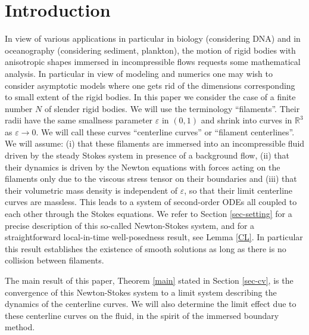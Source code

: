 \documentclass[JEP,XML,SOM,Unicode, NoEqCountersInSection,NoFloatCountersInSection,published]{cedram}
\newcommand{\R}{\mathbb{R}}
\let\eps\varepsilon
\theoremstyle{definition}
\theoremstyle{remark}
\begin{document}
\vspace*{-\baselineskip}\vskip0pt
\section{Introduction}
\label{sec-intro}

In view of various applications in particular in biology (considering DNA) and in oceanography (considering sediment, plankton), the motion of rigid bodies with aniso\-tropic shapes immersed in incompressible flows requests some mathematical analysis.
In particular in view of modeling and numerics one may wish to consider asymptotic models where one gets rid of the dimensions corresponding to small extent of the rigid bodies. In this paper we consider the case of a finite number $N$ of slender rigid bodies. We will use the terminology ``filaments''. Their radii have the same smallness parameter $\eps$ in $(0,1)$ and shrink into curves in $\R^3$ as $\eps \to 0$. We will call these curves ``centerline curves'' or ``filament centerlines''. We will assume: (i) that these filaments are immersed into an incompressible fluid driven by the steady Stokes system in presence of a background flow, (ii) that their dynamics is driven by the Newton equations with forces acting on the filaments only due to the viscous stress tensor on their boundaries and (iii) that their volumetric mass density is independent of $\eps$, so that their limit centerline curves are massless.
This leads to a system of second-order ODEs all coupled to each other through the Stokes equations. We refer to Section \ref{sec-setting} for a precise description of this so-called Newton-Stokes system,
and for a straightforward local-in-time well-posedness result, see Lemma \ref{CL}. In particular this result establishes the existence of smooth solutions as long as there is no collision between filaments.

The main result of this paper, Theorem \ref{main} stated in Section \ref{sec-cv}, is the convergence of this Newton-Stokes system to a limit system describing the dynamics of the centerline curves. We will also determine the limit effect due to these centerline curves on the fluid, in the spirit of the immersed boundary method.
\end{document}
